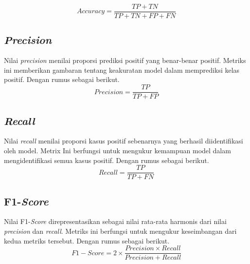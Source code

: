 \begin{equation}
    Accuracy = \frac{TP + TN}{TP + TN + FP + FN}
\end{equation}

\subsection{\textit{Precision}}
Nilai \textit{precision} menilai proporsi prediksi positif yang benar-benar positif. Metriks ini memberikan gambaran tentang keakuratan model dalam memprediksi kelas positif. Dengan rumus sebagai berikut.
\begin{equation}
    Precision = \frac{TP}{TP + FP}
\end{equation}

\subsection{\textit{Recall}}
Nilai \textit{recall} menilai proporsi kasus positif sebenarnya yang berhasil diidentifikasi oleh model. Metrix Ini berfungsi untuk mengukur kemampuan model dalam mengidentifikasi semua kasus positif. Dengan rumus sebagai berikut.
\begin{equation}
    Recall = \frac{TP}{TP + FN}
\end{equation}

\subsection{F1-\textit{Score}}
Nilai F1-\textit{Score} direpresentasikan sebagai nilai rata-rata harmonis dari nilai \textit{precision} dan \textit{recall}. Metriks ini berfungsi untuk mengukur keseimbangan dari kedua metriks tersebut. Dengan rumus sebagai berikut.
\begin{equation}
    F1-Score = 2 \times \frac{Precision \times Recall}{Precision + Recall}
\end{equation}